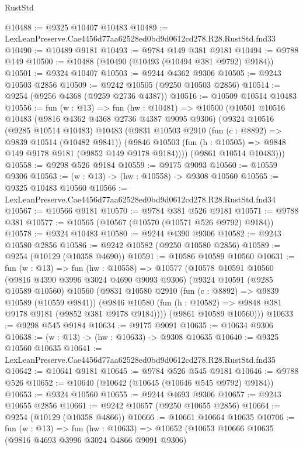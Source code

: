\begin{lexlean}{RustStd}
\begin{coremodule}
@10488 := @9325 @10407 @10483
@10489 := LexLeanPreserve.Cae4456d77aa62528ed0bd9d0612cd278.R28.RustStd.fnd33
@10490 := @10489 @9181
@10493 := @9784 @149 @381 @9181
@10494 := @9788 @149
@10500 := @10488 (@10490 (@10493 (@10494 @381 @9792) @9184))
@10501 := @9324 @10407
@10503 := @9244 @4362 @9306
@10505 := @9243 @10503 @2856
@10509 := @9242 @10505 (@9250 @10503 @2856)
@10514 := @9254 (@9256 @4368 (@9259 @2736 @4387))
@10516 := @10509 @10514 @10483
@10556 := fun (w : @13) =>
  fun (hw : @10481) =>
  @10500
    (@10501
      @10516
      @10483
      (@9816 @4362 @4368 @2736 @4387 @9095 @9306)
      (@9324
        @10516
        (@9285 @10514 @10483)
        @10483
        (@9831
          @10503
          @2910
          (fun (c : @8892) => @9839 @10514 (@10482 @9841))
          (@9846 @10503 (fun (h : @10505) => @9848 @149 @9178 @9181 (@9852 @149 @9178 @9184))))
        (@9861 @10514 @10483)))
@10558 := @9298 @526 @9184
@10559 := @9175 @9093
@10560 := @10559 @9306
@10563 := (w : @13) -> (hw : @10558) -> @9308 @10560
@10565 := @9325 @10483 @10560
@10566 := LexLeanPreserve.Cae4456d77aa62528ed0bd9d0612cd278.R28.RustStd.fnd34
@10567 := @10566 @9181
@10570 := @9784 @381 @526 @9181
@10571 := @9788 @381
@10577 := @10565 (@10567 (@10570 (@10571 @526 @9792) @9184))
@10578 := @9324 @10483
@10580 := @9244 @4390 @9306
@10582 := @9243 @10580 @2856
@10586 := @9242 @10582 (@9250 @10580 @2856)
@10589 := @9254 (@10129 (@10358 @4690))
@10591 := @10586 @10589 @10560
@10631 := fun (w : @13) =>
  fun (hw : @10558) =>
  @10577
    (@10578
      @10591
      @10560
      (@9816 @4390 @3996 @3024 @4690 @9093 @9306)
      (@9324
        @10591
        (@9285 @10589 @10560)
        @10560
        (@9831
          @10580
          @2910
          (fun (c : @8892) => @9839 @10589 (@10559 @9841))
          (@9846 @10580 (fun (h : @10582) => @9848 @381 @9178 @9181 (@9852 @381 @9178 @9184))))
        (@9861 @10589 @10560)))
@10633 := @9298 @545 @9184
@10634 := @9175 @9091
@10635 := @10634 @9306
@10638 := (w : @13) -> (hw : @10633) -> @9308 @10635
@10640 := @9325 @10560 @10635
@10641 := LexLeanPreserve.Cae4456d77aa62528ed0bd9d0612cd278.R28.RustStd.fnd35
@10642 := @10641 @9181
@10645 := @9784 @526 @545 @9181
@10646 := @9788 @526
@10652 := @10640 (@10642 (@10645 (@10646 @545 @9792) @9184))
@10653 := @9324 @10560
@10655 := @9244 @4693 @9306
@10657 := @9243 @10655 @2856
@10661 := @9242 @10657 (@9250 @10655 @2856)
@10664 := @9254 (@10129 (@10358 @4866))
@10666 := @10661 @10664 @10635
@10706 := fun (w : @13) =>
  fun (hw : @10633) =>
  @10652
    (@10653
      @10666
      @10635
      (@9816 @4693 @3996 @3024 @4866 @9091 @9306)

\end{coremodule}
\end{lexlean}
